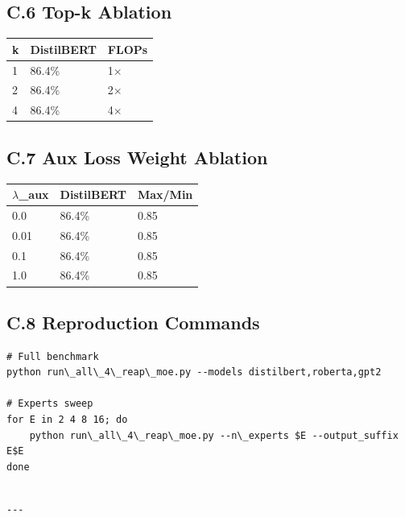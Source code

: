 \subsection{C.6 Top-k Ablation}

\begin{table}[H]
\centering
\small
\begin{tabular}{lll}
\toprule
\textbf{k} & \textbf{DistilBERT} & \textbf{FLOPs} \\
\midrule
1 & 86.4\% & 1$\times$ \\
2 & 86.4\% & 2$\times$ \\
4 & 86.4\% & 4$\times$ \\
\bottomrule
\end{tabular}
\end{table}

\subsection{C.7 Aux Loss Weight Ablation}

\begin{table}[H]
\centering
\small
\begin{tabular}{lll}
\toprule
\textbf{$\lambda$\_aux} & \textbf{DistilBERT} & \textbf{Max/Min} \\
\midrule
0.0 & 86.4\% & 0.85 \\
0.01 & 86.4\% & 0.85 \\
0.1 & 86.4\% & 0.85 \\
1.0 & 86.4\% & 0.85 \\
\bottomrule
\end{tabular}
\end{table}

\subsection{C.8 Reproduction Commands}

\begin{lstlisting}
# Full benchmark
python run\_all\_4\_reap\_moe.py --models distilbert,roberta,gpt2

# Experts sweep
for E in 2 4 8 16; do
    python run\_all\_4\_reap\_moe.py --n\_experts $E --output_suffix E$E
done
\end{lstlisting}
\begin{lstlisting}

---
\end{lstlisting}